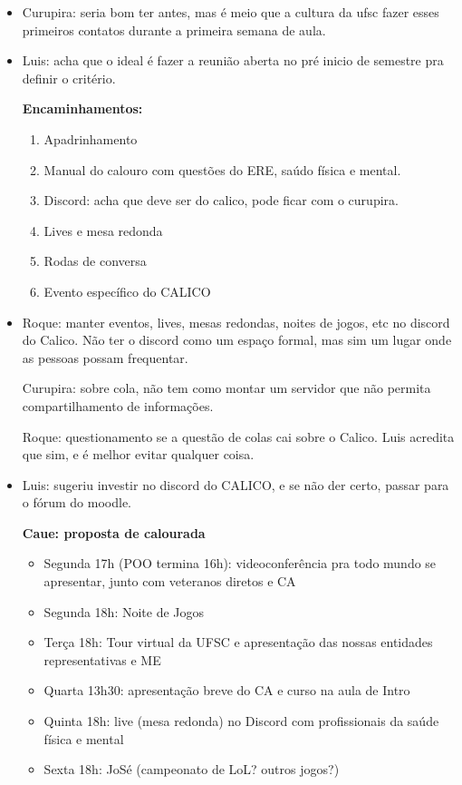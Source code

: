 \documentclass{ata-calico}
\begin{document}
\begin{itemize}
\item Curupira: seria bom ter antes, mas é meio que a cultura da ufsc fazer esses primeiros contatos durante a primeira semana de aula.

\item Luis: acha que o ideal é fazer a reunião aberta no pré inicio de semestre pra definir o critério.\newline

\textbf{Encaminhamentos:}
\begin{enumerate}
\item Apadrinhamento
\item Manual do calouro com questões do ERE, saúdo física e mental.
\item Discord: acha que deve ser do calico, pode ficar com o curupira.
\item Lives e mesa redonda
\item  Rodas de conversa
\item Evento específico do CALICO
\end{enumerate}


\item Roque: manter eventos, lives, mesas redondas, noites de jogos, etc no discord do Calico. 
Não ter o discord como um espaço formal, mas sim um lugar onde as pessoas possam frequentar.

Curupira: sobre cola, não tem como montar um servidor que não permita compartilhamento de informações.

Roque: questionamento se a questão de colas cai sobre o Calico. Luis acredita que sim, e é melhor evitar qualquer coisa.

\item Luis: sugeriu investir no discord do CALICO, e se não der certo, passar para o fórum do moodle.

\textbf{Caue: proposta de calourada}
\begin{itemize}
\item Segunda 17h (POO termina 16h): videoconferência pra todo mundo se apresentar, junto com veteranos diretos e CA
\item Segunda 18h: Noite de Jogos
\item  Terça 18h: Tour virtual da UFSC e apresentação das nossas entidades representativas e ME
\item Quarta 13h30: apresentação breve do CA e curso na aula de Intro
\item  Quinta 18h: live (mesa redonda) no Discord com profissionais da saúde física e mental
\item Sexta 18h: JoSé (campeonato de LoL? outros jogos?)
\end{itemize}


\end{itemize}
\end{document}
